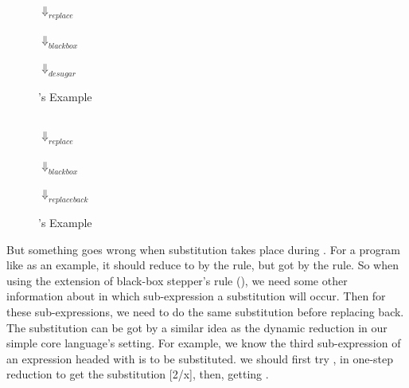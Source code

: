 \begin{center}
\begin{figure}[thb]
\centering \footnotesize
{}\\ $\Downarrow_{replace}$\\ \\ $\Downarrow_{blackbox}$\\ \\ $\Downarrow_{desugar}$\\ 
\caption{'s Example}
\label{fig:e1}
\end{figure}
\begin{figure}[thb]
\centering\footnotesize
{}\\ $\Downarrow_{replace}$ \\\\ $\Downarrow_{blackbox}$\\  \\ $\Downarrow_{replaceback}$\\ 
\caption{'s Example}
\label{fig:e2}
\end{figure}
\end{center}
But something goes wrong when substitution takes place during . For a program like  as an example, it should reduce to  by the  rule, but got  by the  rule. So when using the extension of black-box stepper's rule (), we need some other information about in which sub-expression a substitution will occur. Then for these sub-expressions, we need to do the same substitution before replacing back. The substitution can be got by a similar idea as the dynamic reduction in our simple core language's setting. For example, we know the third sub-expression of an expression headed with  is to be substituted. we should first try ,  in one-step reduction to get the substitution [2/x], then, getting . 


